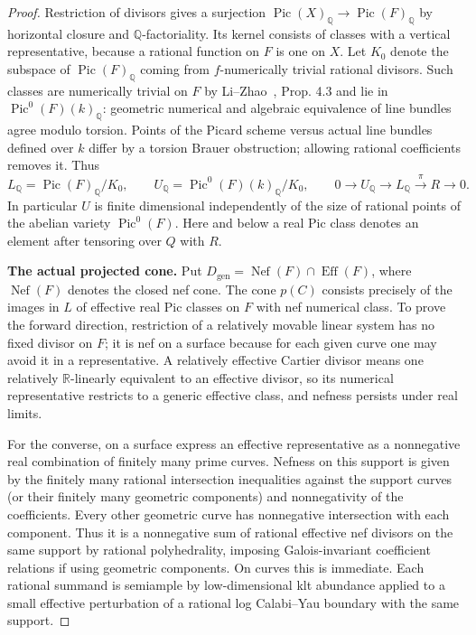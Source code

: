 \documentclass[11pt]{article}
\begin{document}
\begin{proof}
Restriction of divisors gives a surjection \(\operatorname{Pic}(X)_{\mathbb Q}\to\operatorname{Pic}(F)_{\mathbb Q}\) by horizontal closure and \(\mathbb Q\)-factoriality. Its kernel consists of classes with a vertical representative, because a rational function on \(F\) is one on \(X\). Let \(K_0\) denote the subspace of \(\operatorname{Pic}(F)_{\mathbb Q}\) coming from \(f\)-numerically trivial rational divisors. Such classes are numerically trivial on \(F\) by Li--Zhao~\cite{LiZhao}, Prop. 4.3 and lie in \(\operatorname{Pic}^0(F)(k)_{\mathbb Q}\): geometric numerical and algebraic equivalence of line bundles agree modulo torsion. Points of the Picard scheme versus actual line bundles defined over \(k\) differ by a torsion Brauer obstruction; allowing rational coefficients removes it. Thus \[
 L_{\mathbb Q}=\operatorname{Pic}(F)_{\mathbb Q}/K_0,\qquad
 U_{\mathbb Q}=\operatorname{Pic}^0(F)(k)_{\mathbb Q}/K_0,\qquad
 0\longrightarrow U_{\mathbb Q}\longrightarrow L_{\mathbb Q}
 \stackrel{\pi}{\longrightarrow}R\longrightarrow0.
\] In particular \(U\) is finite dimensional independently of the size of rational points of the abelian variety \(\operatorname{Pic}^0(F)\). Here and below a real Pic class denotes an element after tensoring over \(Q\) with \(R\).

\textbf{The actual projected cone.} Put
\(D_{\mathrm{gen}}=\operatorname{Nef}(F)\cap\operatorname{Eff}(F)\), where \(\operatorname{Nef}(F)\) denotes the closed
nef cone. The cone \(p(C)\) consists precisely of the images in \(L\) of effective real Pic classes on
\(F\) with nef numerical class. To prove the forward direction, restriction of a relatively movable
linear system has no fixed divisor on \(F\); it is nef on a surface because for each given curve one may
avoid it in a representative. A relatively effective Cartier divisor means one relatively \(\mathbb
R\)-linearly equivalent to an effective divisor, so its numerical representative restricts to a generic
effective class, and nefness persists under real limits.

For the converse, on a surface express an effective representative as a nonnegative real combination of
finitely many prime curves. Nefness on this support is given by the finitely many rational intersection
inequalities against the support curves (or their finitely many geometric components) and nonnegativity
of the coefficients. Every other geometric curve has nonnegative intersection with each component. Thus
it is a nonnegative sum of rational effective nef divisors on the same support by rational polyhedrality,
imposing Galois-invariant coefficient relations if using geometric components. On curves this is
immediate. Each rational summand is semiample by low-dimensional klt abundance applied to a small
effective perturbation of a rational log Calabi--Yau boundary with the same support.


\end{proof}
\end{document}
